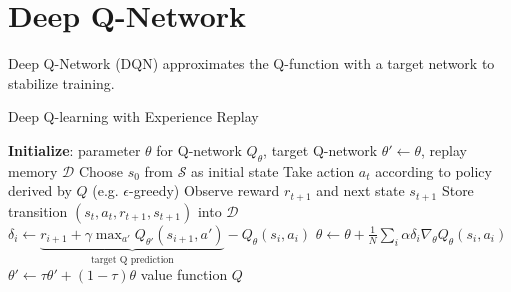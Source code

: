 \newpage
\appendix

\section{Deep Q-Network}

Deep Q-Network (DQN) approximates the Q-function with a target network to stabilize training.

\begin{algorithm}[H]
    \centering 
    \caption{Deep Q-learning with Experience Replay}\label{alg:dqn}
    \begin{algorithmic}[1]
    \State \textbf{Initialize}: parameter $\theta$ for Q-network $Q_{\theta}$, target Q-network $\theta'\leftarrow \theta$, replay memory $\mathcal{D}$
        \State Choose $s_0$ from $\mathcal{S}$ as initial state
        \State Take action $a_t$ according to policy derived by $Q$ (e.g. $\epsilon$-greedy)
        \State Observe reward $r_{t+1}$ and next state $s_{t+1}$
        \State Store transition $(s_t, a_t, r_{t+1}, s_{t+1})$ into $\mathcal{D}$
        \State $\delta_i\leftarrow \underbrace{r_{i+1} +\gamma \max_{a'} Q_{\theta'}(s_{i+1}, a')}_{\text{target Q prediction}} - Q_{\theta}(s_i, a_i)$
        \State $\theta \leftarrow \theta + \frac{1}{N} \sum_i \alpha \delta_i \nabla_{\theta} Q_{\theta}(s_i, a_i)$
        \EndFor
        \State $\theta'\leftarrow \tau \theta' + (1-\tau) \theta$
        \EndFor
    \EndFor
\State \Return value function $Q$
\end{algorithmic}
\end{algorithm}

%
%
%
%
%
%
%
